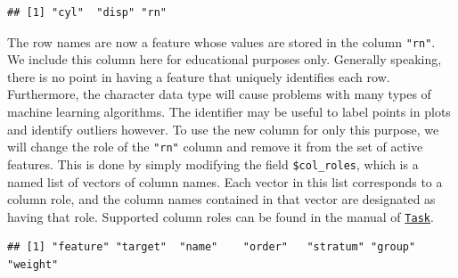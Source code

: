 \documentclass[]{scrbook}
\newenvironment{Shaded}{\begin{snugshade}}{\end{snugshade}}
\newcommand{\CommentTok}[1]{\textcolor[rgb]{0.56,0.35,0.01}{\textit{#1}}}
\newcommand{\DataTypeTok}[1]{\textcolor[rgb]{0.13,0.29,0.53}{#1}}
\newcommand{\DecValTok}[1]{\textcolor[rgb]{0.00,0.00,0.81}{#1}}
\newcommand{\KeywordTok}[1]{\textcolor[rgb]{0.13,0.29,0.53}{\textbf{#1}}}
\newcommand{\NormalTok}[1]{#1}
\newcommand{\OperatorTok}[1]{\textcolor[rgb]{0.81,0.36,0.00}{\textbf{#1}}}
\newcommand{\OtherTok}[1]{\textcolor[rgb]{0.56,0.35,0.01}{#1}}
\newcommand{\StringTok}[1]{\textcolor[rgb]{0.31,0.60,0.02}{#1}}
\renewenvironment{Shaded} {\begin{snugshade}\small} {\end{snugshade}}
\begin{document}
\begin{Shaded}
\end{Shaded}

\begin{verbatim}
## [1] "cyl"  "disp" "rn"
\end{verbatim}

The row names are now a feature whose values are stored in the column \texttt{"rn"}.
We include this column here for educational purposes only.
Generally speaking, there is no point in having a feature that uniquely identifies each row.
Furthermore, the character data type will cause problems with many types of machine learning algorithms.
The identifier may be useful to label points in plots and identify outliers however.
To use the new column for only this purpose, we will change the role of the \texttt{"rn"} column and remove it from the set of active features.
This is done by simply modifying the field \texttt{\$col\_roles}, which is a named list of vectors of column names.
Each vector in this list corresponds to a column role, and the column names contained in that vector are designated as having that role.
Supported column roles can be found in the manual of \href{https://mlr3.mlr-org.com/reference/Task.html}{\texttt{Task}}.

\begin{Shaded}
\end{Shaded}

\begin{verbatim}
## [1] "feature" "target"  "name"    "order"   "stratum" "group"   "weight"
\end{verbatim}
\end{document}
